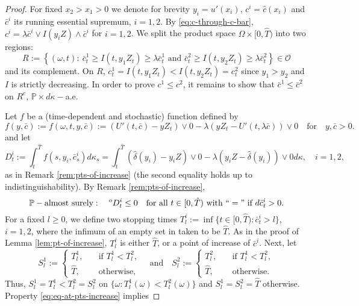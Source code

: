 \documentclass[11pt, oneside]{article}   	%
\theoremstyle{plain}
\theoremstyle{definition}
\theoremstyle{remark}
\begin{document}
\begin{proof}
For fixed $x_2>x_1>0$ we denote for brevity $y_i=u'(x_i)$, $c^i=\hat{c}(x_i)$ and $\bar{c}^i$ its running essential supremum, $i=1,2$. By \eqref{eq:c-through-c-bar}, $c^i=\lambda\bar{c}^i\vee I(y_iZ)\wedge \bar{c}^i$ for $i=1,2$. We split the product space $\Omega\times[0,\hat{T})$ into two regions:
$$R:=\left\{(\omega,t):\ \bar{c}_t^1\geq I(t,y_1Z_t)\geq \lambda\bar{c}^1_t\text{ and } \bar{c}^2_t\geq I(t,y_2Z_t)\geq \lambda\bar{c}^2_t\right\}\in\mathcal{O}$$
and its complement. On $R$, $c^1_t=I(t,y_1Z_t)<I(t,y_2Z_t)=c^2_t$ since $y_1>y_2$ and $I$ is strictly decreasing. In order to prove $c^1\leq c^2$, it remains to show that $\bar{c}^1\leq\bar{c}^2$ on $R^c$, $\mathbb{P}\times d\kappa-$a.e.

Let $f$ be a (time-dependent and stochastic) function defined by
$$f(y,\bar{c}):=f(\omega, t,y,\bar{c}):=(U'(t,\bar{c})-yZ_t)\vee0 -\lambda(yZ_t-U'(t,\lambda\bar{c}))\vee 0\quad\text{for}\quad y,\bar{c}>0.$$
and let
$$D^i_t:=\int_t^{\hat{T}} f\left(s,y_i,\bar{c}^i_s\right) d\kappa_s=\int_t^{\hat{T}} \left(\hat\delta(y_i)-y_iZ\right)\vee0 -\lambda\left(y_iZ-\hat\delta(y_i)\right)\vee 0d\kappa,\quad i=1,2,$$
as in Remark \ref{rem:pts-of-increase} (the second equality holds up to indistinguishability). By Remark \ref{rem:pts-of-increase},
\begin{equation}\label{eq:eq-at-pts-increase}
\mathbb{P}-\text{almost surely}:\quad ^oD^i_t\leq 0\quad\text{for all }t\in [0,\hat{T})\text{ with }``="\text{ if } d\bar{c}^i_t>0.
\end{equation}
For a fixed $l\geq 0$, we define two stopping times
${T}^i_l:=\inf\{t\in[0,\hat{T}): \bar{c}^i_t> l \}$, $i=1,2$, where the infimum of an empty set in taken to be $\hat{T}$. As in the proof of Lemma \ref{lem:pt-of-increase}, ${T}^i_l$ is either $\hat{T}$, or a point of increase of $\bar{c}^i$. Next, let
\begin{equation*}
S^1_l:=\begin{cases}
{T}^1_l,&\quad\text{if }{T}^1_l<{T}^2_l,\\
\hat{T},&\quad\text{otherwise},
\end{cases}\quad\text{and}\quad S^2_l:=
\begin{cases}
{T}^2_l,&\quad\text{if }{T}^1_l<{T}^2_l,\\
\hat{T},&\quad\text{otherwise}.
\end{cases}
\end{equation*}
Thus, $S^1_l={T}^1_l<{T}^2_l=S^2_l$ on $\{\omega: {T}^1_l(\omega)<{T}^2_l(\omega)\}$ and $S^1_l=S^2_l=\hat{T}$ otherwise. Property \eqref{eq:eq-at-pts-increase} implies

\end{proof}
\end{document}
